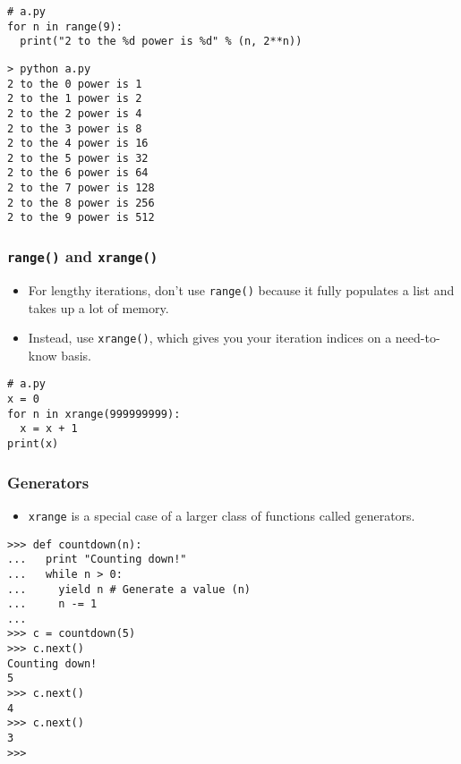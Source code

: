 \documentclass[handout]{beamer}
\numberwithin{equation}{section}
\begin{document}
\begin{frame}[fragile]
\frametitle{}

\begin{lstlisting}[name=ex]
# a.py
for n in range(9):
  print("2 to the %d power is %d" % (n, 2**n))
\end{lstlisting}

\pause

\begin{lstlisting}[name=ex]
> python a.py
2 to the 0 power is 1
2 to the 1 power is 2
2 to the 2 power is 4
2 to the 3 power is 8
2 to the 4 power is 16
2 to the 5 power is 32
2 to the 6 power is 64
2 to the 7 power is 128
2 to the 8 power is 256
2 to the 9 power is 512
\end{lstlisting}
\end{frame}



\begin{frame}[fragile]
\frametitle{{\tt range()} and {\tt xrange()}}

\begin{itemize}
\item For lengthy iterations, don't use {\tt range()} because it fully populates a list and takes up a lot of memory.
\pause \item  Instead, use {\tt xrange()}, which gives you your iteration indices on a need-to-know basis.
\end{itemize}

\pause \begin{lstlisting}[name=ex]
# a.py
x = 0
for n in xrange(999999999):
  x = x + 1
print(x)
\end{lstlisting}
\end{frame}



\begin{frame}[fragile]
\frametitle{Generators}

\begin{itemize}
\item {\tt xrange} is a special case of a larger class of functions called generators.
\end{itemize}

\begin{lstlisting}[name=ex]
>>> def countdown(n):
...   print "Counting down!" 
...   while n > 0:
...     yield n # Generate a value (n) 
...     n -= 1
... 
>>> c = countdown(5)
>>> c.next()
Counting down!
5
>>> c.next()
4
>>> c.next()
3
>>> 
\end{lstlisting}
\end{frame}
\end{document}
